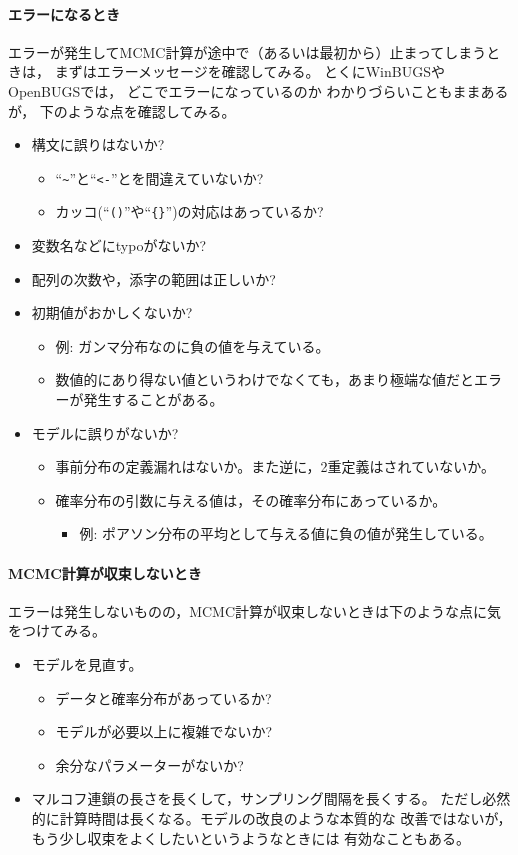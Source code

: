 \documentclass[11pt,uplatex]{jsarticle}
\begin{document}
\paragraph{エラーになるとき}
エラーが発生してMCMC計算が途中で（あるいは最初から）止まってしまうときは，
まずはエラーメッセージを確認してみる。
とくに\textsf{WinBUGS}や\textsf{OpenBUGS}では，
どこでエラーになっているのか わかりづらいこともままあるが，
下のような点を確認してみる。
\begin{itemize}
\item 構文に誤りはないか? 
\begin{itemize}
\item ``\texttt{\textasciitilde}''と``\texttt{<-}''とを間違えていないか?
\item カッコ(``\texttt{()}''や``\texttt{\{\}}'')の対応はあっているか?
\end{itemize}
\item 変数名などにtypoがないか?
\item 配列の次数や，添字の範囲は正しいか?
\item 初期値がおかしくないか?
\begin{itemize}
\item 例: ガンマ分布なのに負の値を与えている。
\item 数値的にあり得ない値というわけでなくても，あまり極端な値だとエラーが発生することがある。
\end{itemize}
\item モデルに誤りがないか?
\begin{itemize}
\item 事前分布の定義漏れはないか。また逆に，2重定義はされていないか。
\item 確率分布の引数に与える値は，その確率分布にあっているか。
\begin{itemize}
\item 例: ポアソン分布の平均として与える値に負の値が発生している。
\end{itemize}
\end{itemize}
\end{itemize}

\paragraph{MCMC計算が収束しないとき}
エラーは発生しないものの，MCMC計算が収束しないときは下のような点に気をつけてみる。
\begin{itemize}
\item モデルを見直す。
\begin{itemize}
\item データと確率分布があっているか?
\item モデルが必要以上に複雑でないか?
\item 余分なパラメーターがないか?
\end{itemize}
\item マルコフ連鎖の長さを長くして，サンプリング間隔を長くする。
  ただし必然的に計算時間は長くなる。モデルの改良のような本質的な
  改善ではないが，もう少し収束をよくしたいというようなときには
  有効なこともある。
\end{itemize}
\end{document}
